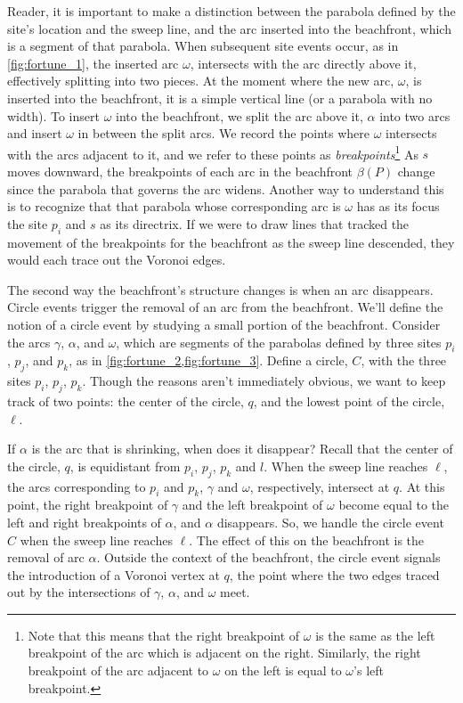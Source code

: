 \documentclass[12pt,twoside]{reedthesis}
\begin{document}
        Reader, it is important to make a distinction between the parabola defined by the site's location and the sweep line, and the arc inserted into the beachfront, which is a segment of that parabola. When subsequent site events occur, as in \cref{fig:fortune_1}, the inserted arc $\omega$, intersects with the arc directly above it, effectively splitting into two pieces. At the moment where the new arc, $\omega$, is inserted into the beachfront, it is a simple vertical line (or a parabola with no width). To insert $\omega$ into the beachfront, we split the arc above it, $\alpha$ into two arcs and insert $\omega$ in between the split arcs. We record the points where $\omega$ intersects with the arcs adjacent to it, and we refer to these points as \emph{breakpoints}\footnote{Note that this means that the right breakpoint of $\omega$ is the same as the left breakpoint of the arc which is adjacent on the right. Similarly, the right breakpoint of the arc adjacent to $\omega$ on the left is equal to $\omega$'s left breakpoint.} As $s$ moves downward, the breakpoints of each arc in the beachfront $\beta(P)$ change since the parabola that governs the arc widens. Another way to understand this is to recognize that that parabola whose corresponding arc is $\omega$ has as its focus the site $p_{i}$ and $s$ as its directrix. If we were to draw lines that tracked the movement of the breakpoints for the beachfront as the sweep line descended, they would each trace out the Voronoi edges. \par


        The second way the beachfront's structure changes is when an arc disappears. Circle events trigger the removal of an arc from the beachfront. We'll define the notion of a circle event by studying a small portion of the beachfront. Consider the arcs $\gamma$, $\alpha$, and $\omega$, which are segments of the parabolas defined by three sites $p_{i}$, $p_{j}$, and $p_{k}$, as in \cref{fig:fortune_2,fig:fortune_3}. Define a circle, $C$, with the three sites $p_{i}$, $p_{j}$, $p_{k}$. Though the reasons aren't immediately obvious, we want to keep track of two points: the center of the circle, $q$, and the lowest point of the circle, $\ell$.\par

        If $\alpha$ is the arc that is shrinking, when does it disappear? Recall that the center of the circle, $q$, is equidistant from $p_{i}$, $p_{j}$, $p_{k}$ and $l$. When the sweep line reaches $\ell$, the arcs corresponding to $p_{i}$ and $p_{k}$, $\gamma$ and $\omega$, respectively, intersect at $q$. At this point, the right breakpoint of $\gamma$ and the left breakpoint of $\omega$ become equal to the left and right breakpoints of $\alpha$, and $\alpha$ disappears. So, we handle the circle event $C$ when the sweep line reaches $\ell$. The effect of this on the beachfront is the removal of arc $\alpha$. Outside the context of the beachfront, the circle event signals the introduction of a Voronoi vertex at $q$, the point where the two edges traced out by the intersections of $\gamma$, $\alpha$, and $\omega$ meet.\par
\end{document}
